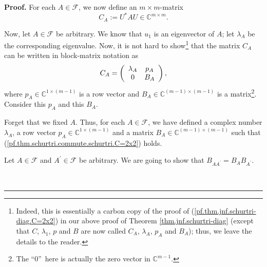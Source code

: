 \documentclass[numbers=enddot,12pt,final,onecolumn,notitlepage]{scrartcl}%
\numberwithin{exer}{subsection}
\theoremstyle{definition}
\newenvironment{proof}[1][Proof]{\noindent\textbf{#1.} }{\ \rule{0.5em}{0.5em}}
\begin{document}
\begin{proof}
For each $A\in\mathcal{F}$, we now define an $m\times m$-matrix%
\[
C_{A}:=U^{\ast}AU\in\mathbb{C}^{m\times m}.
\]


Now, let $A\in\mathcal{F}$ be arbitrary. We know that $u_{1}$ is an
eigenvector of $A$; let $\lambda_{A}$ be the corresponding eigenvalue. Now, it
is not hard to show\footnote{Indeed, this is essentially a carbon copy of the
proof of (\ref{pf.thm.jnf.schurtri-diag.C=2x2}) in our above proof of Theorem
\ref{thm.jnf.schurtri-diag} (except that $C$, $\lambda_{1}$, $p$ and $B$ are
now called $C_{A}$, $\lambda_{A}$, $p_{A}$ and $B_{A}$); thus, we leave the
details to the reader.} that the matrix $C_{A}$ can be written in block-matrix
notation as%
\begin{equation}
C_{A}=\left(
\begin{array}
[c]{cc}%
\lambda_{A} & p_{A}\\
0 & B_{A}%
\end{array}
\right)  ,\label{pf.thm.schurtri.commute.schurtri.C=2x2}%
\end{equation}
where $p_{A}\in\mathbb{C}^{1\times\left(  m-1\right)  }$ is a row vector and
$B_{A}\in\mathbb{C}^{\left(  m-1\right)  \times\left(  m-1\right)  }$ is a
matrix\footnote{The \textquotedblleft$0$\textquotedblright\ here is actually
the zero vector in $\mathbb{C}^{m-1}$.}. Consider this $p_{A}$ and this
$B_{A}$.

Forget that we fixed $A$. Thus, for each $A\in\mathcal{F}$, we have defined a
complex number $\lambda_{A}$, a row vector $p_{A}\in\mathbb{C}^{1\times\left(
m-1\right)  }$ and a matrix $B_{A}\in\mathbb{C}^{\left(  m-1\right)
\times\left(  m-1\right)  }$ such that
(\ref{pf.thm.schurtri.commute.schurtri.C=2x2}) holds.

Let $A\in\mathcal{F}$ and $A^{\prime}\in\mathcal{F}$ be arbitrary. We are
going to show that $B_{AA^{\prime}}=B_{A}B_{A^{\prime}}$.


\end{proof}
\end{document}

